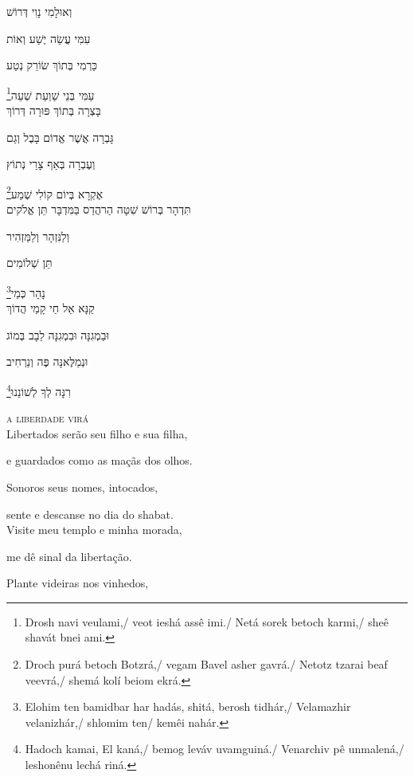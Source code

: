 וְאוּלָמִי נָוִי דְּרוֹשׁ

עִמִּי עֲשֵׂה יֶשַׁע וְאוֹת

כַּרְמִי בְּתוֹךְ שׂוֹרֵק נְטַע

\footnote{Drosh navi veulami,/ veot ieshá assê imi./ Netá sorek betoch karmi,/ sheê shavát bnei ami.}עַמִּי בְּנֵי שַׁוְעַת שְׁעֵה\\[10pt]



בָּצְרָה בְּתוֹךְ פּוּרָה דְּרוֹךְ

גָּבְרָה אֲשֶׁר אֱדוֹם בָּבֶל וְגַם

וְעֶבְרָה בְּאַף צָרַי נְתוֹץ

\footnote{Droch purá betoch Botzrá,/ vegam Bavel asher gavrá./ Netotz tzarai beaf veevrá,/ shemá kolí beiom ekrá.}אֶקְרָא בְּיוֹם קוֹלִי שְׁמַע\\[10pt]


תִּדְהָר בְּרוֹשׁ שִׁטָּה הַרהֲדַס בַּמִּדְבָּר תֵּן אֱלֹקים

וְלַנִּזְהָר וְלַמַּזְהִיר

תֵּן שְׁלוֹמִים

\footnote{Elohim ten bamidbar har hadás, shitá, berosh tidhár,/ Velamazhir velanizhár,/ shlomim ten/ kemêi nahár.}נָהָר כְּמֵי\\[10pt]

קַנָּא אֵל חַי קָמַי הֲדוֹךְ

וּבַמְגִנָּה וּבִמְגִנָּה לֵבָב בְּמוֹג

וּנְמַלֶּאנָּה פֶּה וְנַרְחִיב

\footnote{Hadoch kamai, El kaná,/ bemog leváv uvamguiná./ Venarchiv pê unmalená,/ leshonênu lechá riná.}רִנָּה לְךָ לְשׁוֹנֵנוּ


\movetooddpage
\raggedright

\vspace*{1cm}

\textsc{a liberdade virá}\\[15pt]


Libertados serão seu filho e sua filha,

e guardados como as maçãs dos olhos.

Sonoros seus nomes, intocados,

sente e descanse no dia do shabat.\\[10pt]


Visite meu templo e minha morada,

me dê sinal da libertação.

Plante videiras nos vinhedos,

